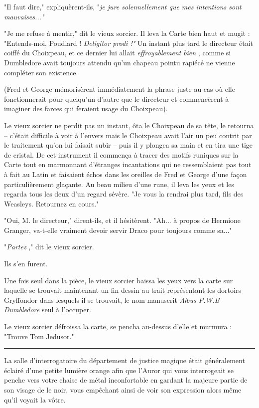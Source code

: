 "Il faut dire," expliquèrent-ils, "\emph{je jure solennellement que mes intentions sont mauvaises..."} 

"Je me refuse à mentir," dit le vieux sorcier. Il leva la Carte bien haut et mugit : "Entends-moi, Poudlard ! \emph{Deligitor prodi !"}  Un instant plus tard le directeur était coiffé du Choixpeau, et ce dernier lui allait \emph{effroyablement}  \emph{bien} , comme si Dumbledore avait toujours attendu qu'un chapeau pointu rapiécé ne vienne compléter son existence.

(Fred et George mémorisèrent immédiatement la phrase juste au cas où elle fonctionnerait pour quelqu'un d'autre que le directeur et commencèrent à imaginer des farces qui feraient usage du Choixpeau).

Le vieux sorcier ne perdit pas un instant, ôta le Choixpeau de sa tête, le retourna – c'était difficile à voir à l'envers mais le Choixpeau avait l'air un peu contrit par le traitement qu'on lui faisait subir – puis il y plongea sa main et en tira une tige de cristal. De cet instrument il commença à tracer des motifs runiques sur la Carte tout en marmonnant d'étranges incantations qui ne ressemblaient pas tout à fait au Latin et faisaient échos dans les oreilles de Fred et George d'une façon particulièrement glaçante. Au beau milieu d'une rune, il leva les yeux et les regarda tous les deux d'un regard sévère. "Je vous la rendrai plus tard, fils des Weasleys. Retournez en cours."

"Oui, M. le directeur," dirent-ils, et il hésitèrent. "Ah... à propos de Hermione Granger, va-t-elle vraiment devoir servir Draco pour toujours comme sa..."

"\emph{Partez} ," dit le vieux sorcier.

Ils s'en furent.

Une fois seul dans la pièce, le vieux sorcier baissa les yeux vers la carte sur laquelle se trouvait maintenant un fin dessin au trait représentant les dortoirs Gryffondor dans lesquels il se trouvait, le nom manuscrit \emph{Albus P.W.B Dumbledore}  seul à l'occuper.

Le vieux sorcier défroissa la carte, se pencha au-dessus d'elle et murmura : "Trouve Tom Jedusor."
\par\noindent\rule{\textwidth}{0.4pt}
La salle d'interrogatoire du département de justice magique était généralement éclairé d'une petite lumière orange afin que l'Auror qui vous interrogeait se penche vers votre chaise de métal inconfortable en gardant la majeure partie de son visage de le noir, vous empêchant ainsi de voir son expression alors même qu'il voyait la vôtre.

